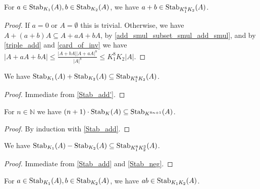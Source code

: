 \begin{lemma}
    \label{Stab_add'}
    \leanok
    For $a \in \operatorname{\operatorname{Stab}}_{K_1}(A), b \in \operatorname{\operatorname{Stab}}_{K_2}(A)$, we have $a+b \in \operatorname{\operatorname{Stab}}_{K_1^8 K_2}(A)$.
\end{lemma}

\begin{proof}
    \leanok
    If $a = 0$ or $A = \emptyset$ this is trivial. Otherwise, we have $A + (a+b) A \subseteq A + a A + b A$, by \ref{add_smul_subset_smul_add_smul},
    and by \ref{triple_add} and \ref{card_of_inv} we have $|A + a A + b A| \leq \frac{|A + bA| |A + aA|^8} {|A|^8} \leq K_1^8 K_2 |A|$.
\end{proof}

\begin{lemma}
    \label{Stab_add}
    \leanok
    We have $\operatorname{\operatorname{Stab}}_{K_1}(A) + \operatorname{\operatorname{Stab}}_{K_2}(A) \subseteq \operatorname{\operatorname{Stab}}_{K_1^8 K_2}(A)$.
\end{lemma}

\begin{proof}
    \leanok
    Immediate from \ref{Stab_add'}.
\end{proof}

\begin{lemma}
    \label{Stab_nsmul}
    \leanok
    For $n \in \mathbb{N}$ we have $(n+1) \cdot \operatorname{\operatorname{Stab}}_{K}(A) \subseteq \operatorname{\operatorname{Stab}}_{K^{8n + 1}}(A)$.
\end{lemma}

\begin{proof}
    \leanok
    By induction with \ref{Stab_add}.
\end{proof}

\begin{lemma}
    \label{Stab_sub}
    \leanok
    We have $\operatorname{\operatorname{Stab}}_{K_1}(A) - \operatorname{\operatorname{Stab}}_{K_2}(A) \subseteq \operatorname{\operatorname{Stab}}_{K_1^8 K_2^3}(A)$.
\end{lemma}

\begin{proof}
    \leanok
    Immediate from \ref{Stab_add} and \ref{Stab_neg}.
\end{proof}

\begin{lemma}
    \label{Stab_mul'}
    \leanok
    For $a \in \operatorname{\operatorname{Stab}}_{K_1}(A), b \in \operatorname{\operatorname{Stab}}_{K_2}(A)$, we have $ab \in \operatorname{\operatorname{Stab}}_{K_1 K_2}(A)$.
\end{lemma}

